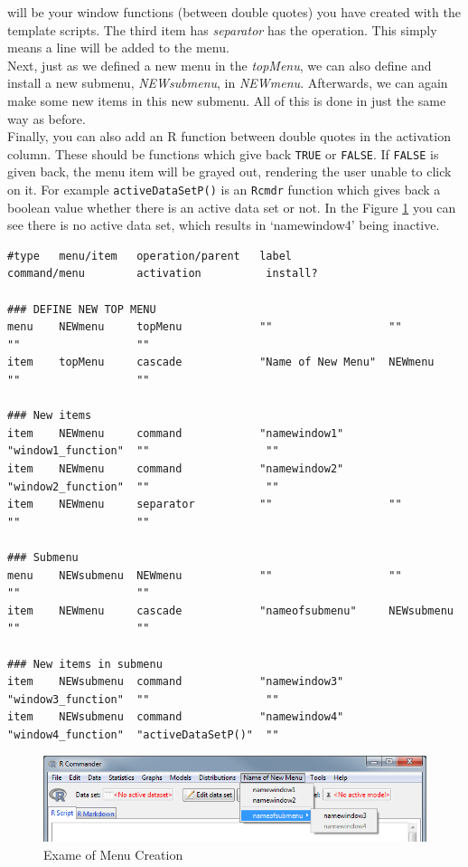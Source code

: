 \documentclass[a4paper]{article}\usepackage[]{graphicx}\usepackage[]{color}
\begin{document}
will be your window functions (between double quotes) you have created with the template scripts. The
third item has {\it separator} has the operation. This simply means a line will
be added to the menu.\\
Next, just as we defined a new menu in the {\it topMenu}, we can also define and
install a new submenu, {\it NEWsubmenu}, in {\it NEWmenu}. Afterwards, we can again make some
new items in this new submenu. All of this is done in just the same way as
before.\\
Finally, you can also add an R function between double quotes in the activation
column. These should be functions which give back \verb|TRUE| or \verb|FALSE|.
If \verb|FALSE| is given back, the menu item will be grayed out, rendering the
user unable to click on it. For example \verb|activeDataSetP()| is an
\verb|Rcmdr| function which gives back a boolean value whether there is an
active data set or not. In the Figure \ref{examplemenus} you can see there is no
active data set, which results in `namewindow4' being inactive.

\footnotesize
\begin{verbatim}
#type   menu/item   operation/parent   label               command/menu        activation          install?

### DEFINE NEW TOP MENU	
menu    NEWmenu     topMenu            ""                  ""                  ""                  ""
item    topMenu     cascade            "Name of New Menu"  NEWmenu             ""                  ""

### New items
item    NEWmenu     command            "namewindow1"       "window1_function"  ""                  ""
item    NEWmenu     command            "namewindow2"       "window2_function"  ""                  ""
item    NEWmenu     separator          ""                  ""                  ""                  ""

### Submenu
menu    NEWsubmenu  NEWmenu            ""                  ""                  ""                  ""
item    NEWmenu     cascade            "nameofsubmenu"     NEWsubmenu          ""                  ""

### New items in submenu
item    NEWsubmenu  command            "namewindow3"       "window3_function"  ""                  ""
item    NEWsubmenu  command            "namewindow4"       "window4_function"  "activeDataSetP()"  ""
\end{verbatim}
\normalsize
\begin{figure}[H]
\centering
\includegraphics[width=12cm]{figures/examplemenus.png}
\caption{Exame of Menu Creation \label{examplemenus}}
\end{figure}
\end{document}
